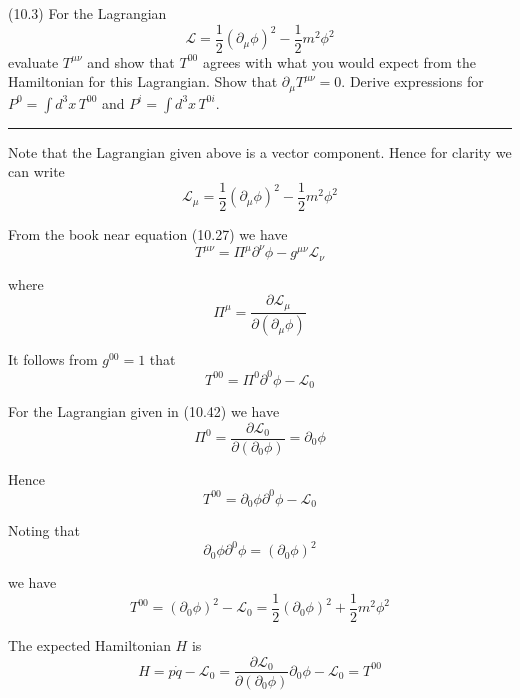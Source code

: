 \documentclass[12pt]{article}
\begin{document}
(10.3)
For the Lagrangian
\begin{equation*}
\mathcal L=\frac{1}{2}(\partial_\mu\phi)^2-\frac{1}{2}m^2\phi^2
\tag{10.42}
\end{equation*}
evaluate $T^{\mu\nu}$ and show that $T^{00}$ agrees with what
you would expect from the Hamiltonian for this Lagrangian.
Show that $\partial_\mu T^{\mu\nu}=0$. Derive expressions
for $P^0=\int d^3x\,T^{00}$ and $P^i=\int d^3x\,T^{0i}$.

\bigskip
\hrule

\bigskip
Note that the Lagrangian given above is a vector component.
Hence for clarity we can write
\begin{equation*}
\mathcal L_\mu=\frac{1}{2}(\partial_\mu\phi)^2-\frac{1}{2}m^2\phi^2
\tag{10.42}
\end{equation*}

From the book near equation (10.27) we have
\begin{equation*}
T^{\mu\nu}=\Pi^\mu\partial^\nu\phi-g^{\mu\nu}\mathcal L_\nu
\end{equation*}

where
\begin{equation*}
\Pi^\mu=\frac{\partial\mathcal L_\mu}{\partial(\partial_\mu\phi)}
\end{equation*}

It follows from $g^{00}=1$ that
\begin{equation*}
T^{00}=\Pi^0\partial^0\phi-\mathcal L_0
\end{equation*}

For the Lagrangian given in (10.42) we have
\begin{equation*}
\Pi^0=\frac{\partial\mathcal L_0}{\partial(\partial_0\phi)}=\partial_0\phi
\end{equation*}

Hence
\begin{equation*}
T^{00}=\partial_0\phi\partial^0\phi-\mathcal L_0
\end{equation*}

Noting that
\begin{equation*}
\partial_0\phi\partial^0\phi=(\partial_0\phi)^2
\end{equation*}

we have
\begin{equation*}
T^{00}=(\partial_0\phi)^2-\mathcal L_0=\frac{1}{2}(\partial_0\phi)^2+\frac{1}{2}m^2\phi^2
\end{equation*}

The expected Hamiltonian $H$ is
\begin{equation*}
H=p\dot q-\mathcal L_0
=\frac{\partial\mathcal L_0}{\partial(\partial_0\phi)}\partial_0\phi-\mathcal L_0
=T^{00}
\end{equation*}
\end{document}
